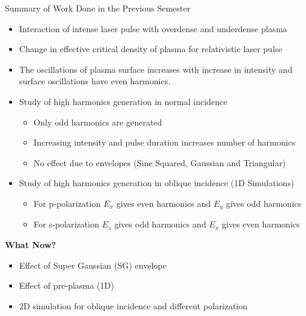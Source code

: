 \documentclass{beamer}
\begin{document}
\begin{frame}{Summary of Work Done in the Previous Semester}
    \small
    \begin{itemize}
        \item Interaction of intense laser pulse with overdense and underdense plasma
        \item Change in effective critical density of plasma for relativistic laser pulse
        \item The oscillations of plasma surface increases with increase in intensity and surface oscillations have even harmonics.
        \item Study of high harmonics generation in normal incidence
              \begin{itemize}
                  \item Only odd harmonics are generated
                  \item Increasing intensity and pulse duration increases number of harmonics
                  \item No effect due to envelopes (Sine Squared, Gaussian and Triangular)
              \end{itemize}
        \item Study of high harmonics generation in oblique incidence (1D Simulations)
              \begin{itemize}
                  \item For p-polarization $E_x$ gives even harmonics and $E_y$ gives odd harmonics
                  \item For s-polarization $E_z$ gives odd harmonics and $E_x$ gives even harmonics
              \end{itemize}
    \end{itemize}

    \textbf{What Now?}
    \begin{itemize}
        \item Effect of Super Gaussian (SG) envelope
        \item Effect of pre-plasma (1D)
        \item 2D simulation for oblique incidence and different polarization
    \end{itemize}
\end{frame}
\end{document}
